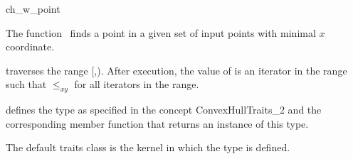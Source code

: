 

\begin{ccRefFunction}{ch_w_point}  %

\ccDefinition
  
The function \ccRefName\ finds a point in a given set  
of input points with minimal $x$ coordinate.


           {traverses the range [,).
            After execution, the value of
             is an iterator in the range such that  $\le_{xy}$
             for all iterators  in the range.}


 defines the type  as specified in
the concept ConvexHullTraits\_2 and the corresponding member
function that returns an instance of this type.


The default traits class  is the kernel in which the
type  is defined.


\ccSeeAlso

 \\
 \\
 \\
 \\
 \\

\end{ccRefFunction}


